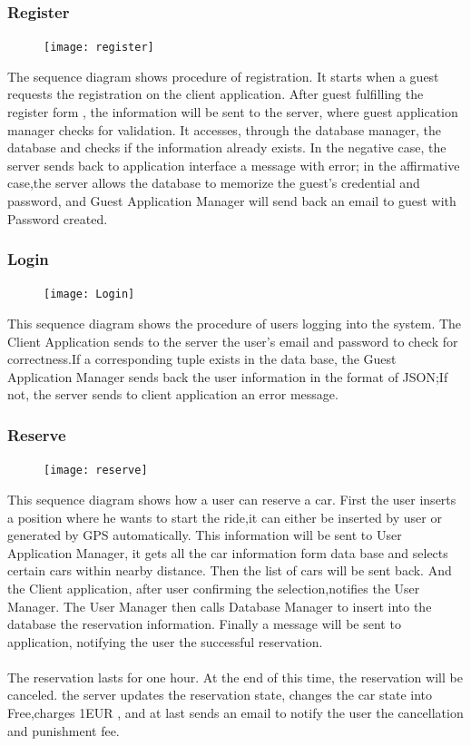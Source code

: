 \documentclass{article}
\begin{document}
	\subsubsection{Register}
	\begin{figure}[h]
		\texttt{[image: register]}
	\end{figure}
	The sequence diagram shows procedure of registration. It starts when a guest requests the registration on the client application. After guest fulfilling the register form , the information will be sent to the server, where guest application manager checks for validation. It accesses, through the database manager, the database and checks if the information already exists. In the negative case, the server sends back to application interface a message with error; in the affirmative case,the server allows the database to memorize the guest's credential and password, and Guest Application Manager will send back an email to guest with Password created.   
	
	\newpage
	\subsubsection{Login}
	\begin{figure}[h]
		\texttt{[image: Login]}
	\end{figure}
	This sequence diagram shows the procedure of users  logging into the system. The Client Application sends to the server  the user's email and password to check for correctness.If a corresponding tuple exists in the data base, the Guest Application Manager sends back the user information in the format of JSON;If not, the server sends to client application an error message.
	\newpage
	\subsubsection{Reserve}
	\begin{figure}[h]
		\texttt{[image: reserve]}
	\end{figure}
	This sequence diagram shows how a user can reserve a car. First the user inserts a position where he wants to start the ride,it can either be inserted by user or generated by GPS automatically. This information will be sent to User Application Manager, it gets all the car information form data base and selects certain cars within nearby distance. Then the list of cars will be sent back. And the Client  application, after user confirming the selection,notifies the User Manager. The User Manager then  calls Database Manager to insert into the database the reservation information. Finally a message will be sent to application, notifying the user the successful reservation.\\
	\\The reservation lasts for one hour. At the end of this time, the reservation will be canceled. the server updates the reservation state, changes the car state into Free,charges 1EUR , and at last sends an email to notify the user the cancellation and punishment fee.
	
\end{document}
